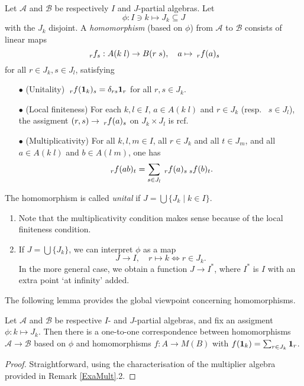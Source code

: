 \begin{Def}\label{DefMor} Let $\mathscr{A}$ and $\mathscr{B}$ be respectively $I$ and $J$-partial algebras. Let \[\phi: I \ni k \mapsto J_k \subseteq J\] with the $J_k$ disjoint. A \emph{homomorphism} (based on $\phi$) from $\mathscr{A}$ to $\mathscr{B}$ consists of linear maps \[\GrDA{f}{r}{s}: A(k\;l)\rightarrow B(r\;s),\quad a\mapsto \GrDA{f(a)}{r}{s}\] for all $r\in J_k, s\in J_l$, satisfying 
\begin{itemize}
\item[$\bullet$] (Unitality) $\GrDA{f(\Unit_{k})}{r}{s} = \delta_{rs}\Unit_r$ for all $r,s\in J_k$.
\item[$\bullet$] (Local finiteness) For each $k,l\in I$, $a\in A(k\;l)$ and $r\in J_k$ (resp.~ $s\in J_l$), the assigment $(r,s)\rightarrow \GrDA{f(a)}{r}{s}$ on $J_k\times J_l$ is rcf. 
\item[$\bullet$] (Multiplicativity) For all $k,l,m\in I$, all $r\in J_k$ and all $t\in J_m$, and all $a\in A(k\;l)$ and $b\in A(l\;m)$, one has \[\GrDA{f(ab)}{r}{t} = \sum_{s\in J_l} \GrDA{f(a)}{r}{s}\GrDA{f(b)}{s}{t}.\]
\end{itemize} 
The homomorphism is called \emph{unital} if $J=\bigcup \{J_k\mid k\in I\}$. %
\end{Def}
\begin{Rem}
\begin{enumerate}
\item
Note that the multiplicativity condition makes sense because of the local finiteness condition.
\item
If $J = \bigcup\{J_k\}$, we can interpret $\phi$ as a map \[J\rightarrow I,\quad r\mapsto k \iff r\in J_k.\] In the more general case, we obtain a function $J\rightarrow I^*$, where $I^*$ is $I$ with an extra point `at infinity' added.
\end{enumerate}
\end{Rem}

The following lemma provides the global viewpoint concerning homomorphisms. 

\begin{Lem} Let $\mathscr{A}$ and $\mathscr{B}$ be respective $I$- and $J$-partial algebras, and fix an assigment $\phi: k\mapsto J_k$. Then there is a one-to-one correspondence between homomorphisms $\mathscr{A}\rightarrow \mathscr{B}$ based on $\phi$ and homomorphisms $f:A\rightarrow M(B)$ with $f(\Unit_k) = \sum_{r\in J_k} \Unit_r$. 
\end{Lem} 
\begin{proof}
Straightforward, using the characterisation of the multiplier algebra provided in Remark \ref{ExaMult}.2.
\end{proof}

